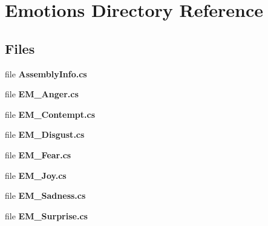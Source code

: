 \section{Emotions Directory Reference}
\label{dir_2ad50cd204f9bd70b0d428ef82c66388}
\subsection*{Files}
\begin{DoxyCompactItemize}
\item 
file \textbf{ Assembly\+Info.\+cs}
\item 
file \textbf{ E\+M\+\_\+\+Anger.\+cs}
\item 
file \textbf{ E\+M\+\_\+\+Contempt.\+cs}
\item 
file \textbf{ E\+M\+\_\+\+Disgust.\+cs}
\item 
file \textbf{ E\+M\+\_\+\+Fear.\+cs}
\item 
file \textbf{ E\+M\+\_\+\+Joy.\+cs}
\item 
file \textbf{ E\+M\+\_\+\+Sadness.\+cs}
\item 
file \textbf{ E\+M\+\_\+\+Surprise.\+cs}
\end{DoxyCompactItemize}
